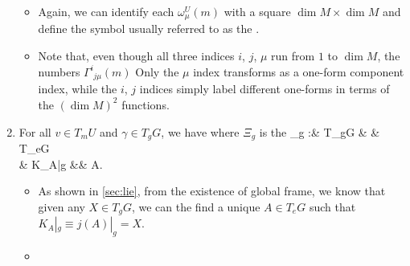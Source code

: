 \documentclass{article}
\newcommand{\cl}{:\text{ }}
\begin{document}
\begin{enumerate}
\begin{enumerate}
\end{enumerate}
\begin{itemize}
\item {} Again, we can identify each $\omega^U_\mu(m)$ with a square $\dim M \times \dim M$  and define the symbol
usually referred to as the {}. 
    \item Note that, even though all three indices $i$, $j$, $\mu$ run from $1$ to $\dim M$, the numbers $\Gamma^i_{\phantom{i}j\mu} (m)$   Only the $\mu$ index transforms as a one-form component index, while the $i$, $j$ indices simply label different one-forms in terms of the $(\dim M)^2$ functions. 
\end{itemize}

\item {}
For all $v\in T_mU$ and $\gamma \in T_gG$, we have
where $\Xi_g$ is the 
\Xi_g \cl & T_gG & \xrightarrow{\sim} & T_eG\\
& K_A|g &\mapsto & A.
\ei
\begin{itemize}
    \item  As shown in \cref{sec:lie}, from the existence of global frame, we know that given any $X\in T_gG$, we can the find a unique $A \in T_eG$ such that $K_A|_g\equiv j(A)|_g=X$.
    \item {} 
\end{itemize}



\end{enumerate}
\end{document}
